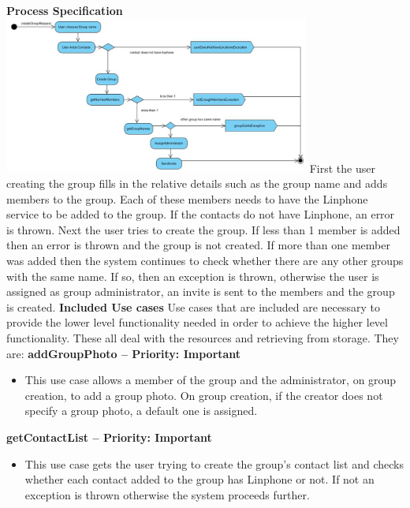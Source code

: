 \documentclass[11pt]{article}
\begin{document}
 \newline
\textbf{Process Specification} \newline
 \newline
 \includegraphics[width=380px]{./images/process-create.jpg}
  \newline
 First the user creating the group fills in the relative details such as the group name and adds members to the group. Each of these members needs to have the Linphone service to be added to the group. If the contacts do not have Linphone, an error is thrown. Next the user tries to create the group. If less than 1 member is added then an error is thrown and the group is not created. If more than one member was added then the system continues to check whether there are any other groups with the same name. If so, then an exception is thrown, otherwise the user is assigned as group administrator, an invite is sent to the members and the group is created.\newline
 \newline
 \textbf{Included Use cases} \newline
 Use cases that are included are necessary to provide the lower level functionality needed in order to achieve the higher level functionality. These all deal with the resources and retrieving from storage. They  are:\newline
 \newline
 \textbf{addGroupPhoto  – Priority: Important} \newline
 \begin{itemize}
 \item	This use case allows a member of the group and the administrator, on group creation, to add a group photo. On group creation, if the creator does not specify a group photo, a default one is assigned.\newline
 \end{itemize}
 \textbf{getContactList – Priority: Important} \newline
 \begin{itemize}
 \item	This use case gets the user trying to create the group’s contact list and checks whether each contact added to the group has Linphone or not. If not an exception is thrown otherwise the system proceeds further.\newline
 \end{itemize}
\end{document}
